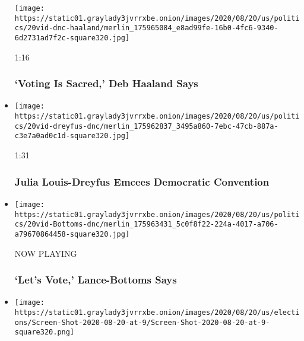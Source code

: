 \begin{itemize}
  \texttt{[image: https://static01.graylady3jvrrxbe.onion/images/2020/08/20/us/politics/20vid-dnc-haaland/merlin\_175965084\_e8ad99fe-16b0-4fc6-9340-6d2731ad7f2c-square320.jpg]}

  1:16

  \hypertarget{voting-is-sacred-deb-haaland-says}{%
  \subsubsection{`Voting Is Sacred,' Deb Haaland
  Says}\label{voting-is-sacred-deb-haaland-says}}
\item
  \href{https://www.nytimes3xbfgragh.onion/video/us/elections/100000007299846/julia-louis-dreyfus-speaks-dnc.html?action=click\&module=video-series-bar\&region=header\&pgtype=Article\&playlistId=video/2020-Elections}{}

  \texttt{[image: https://static01.graylady3jvrrxbe.onion/images/2020/08/20/us/politics/20vid-dreyfus-dnc/merlin\_175962837\_3495a860-7ebc-47cb-887a-c3e7a0ad0c1d-square320.jpg]}

  1:31

  \hypertarget{julia-louis-dreyfus-emcees-democratic-convention}{%
  \subsubsection{Julia Louis-Dreyfus Emcees Democratic
  Convention}\label{julia-louis-dreyfus-emcees-democratic-convention}}
\item
  \texttt{[image: https://static01.graylady3jvrrxbe.onion/images/2020/08/20/us/politics/20vid-Bottoms-dnc/merlin\_175963431\_5c0f8f22-224a-4017-a706-a79670864458-square320.jpg]}

  NOW PLAYING

  \hypertarget{lets-vote-lance-bottoms-says-2}{%
  \subsubsection{`Let's Vote,' Lance-Bottoms
  Says}\label{lets-vote-lance-bottoms-says-2}}
\item
  \href{https://www.nytimes3xbfgragh.onion/video/us/elections/100000007299993/gavin-newsom-speaks-dnc.html?action=click\&module=video-series-bar\&region=header\&pgtype=Article\&playlistId=video/2020-Elections}{}

  \texttt{[image: https://static01.graylady3jvrrxbe.onion/images/2020/08/20/us/elections/Screen-Shot-2020-08-20-at-9/Screen-Shot-2020-08-20-at-9-square320.png]}


\end{itemize}
